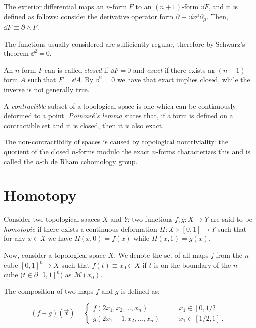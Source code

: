 \documentclass[main.tex]{subfiles}
\begin{document}
The exterior differential maps an \(n\)-form \(F\) to an \((n+1)\)-form \(\dd{F}\), and it is defined as follows:
consider the derivative operator form \(\partial \equiv \dd{x^{\mu}} \partial _\mu\).
Then, \(\dd{F} \equiv \partial \wedge F\).

The functions usually considered are sufficiently regular, therefore by Schwarz's theorem \(\dd^2 = 0\).

An \(n\)-form \(F\) can is called \emph{closed} if \(\dd{F}= 0 \) and \emph{exact} if there exists an \((n-1)\)-form \(A\) such that \(F = \dd{A}\).
By \(\dd^2=0\) we have that exact implies closed, while the inverse is not generally true.

A \emph{contractible} subset of a topological space is one which can be continuously deformed to a point.
\emph{Poincaré's lemma} states that, if a form is defined on a contractible set and it is closed, then it is also exact.

The non-contractibiliy of spaces is caused by topological nontriviality: the quotient of the closed \(n\)-forms modulo the exact \(n\)-forms characterizes this and is called the \(n\)-th de Rham cohomology group. 

\section{Homotopy} \label{sec:homotopy}

Consider two topological spaces \(X\) and \(Y\): two functions \(f, g \colon X \rightarrow Y\) are said to be \emph{homotopic} if there exists a continuous deformation \(H \colon X \times [0,1] \rightarrow Y\) such that for any \(x \in X\) we have \(H(x, 0) = f(x)\) while \(H(x, 1) = g(x)\).

Now, consider a topological space \(X\).
We denote the set of all maps \(f\) from the \(n\)-cube \([0,1]^n \rightarrow X\) such that  \(f(t) \equiv x_0 \in X\) if \(t\) is on the boundary of the \(n\)-cube (\(t\in \partial [0,1]^{n}\)) as $\mathcal M(x_0)$.

The composition of two maps \(f\) and \(g\) is defined as:

\begin{equation}
  (f+g) (\vec{x} ) = \begin{cases}
  f(2x_1, x_2, \dots, x_n) \qquad & x_1 \in [0, 1/2 ] \\
  g(2x_1-1, x_2, \dots, x_n) \qquad & x_1 \in [1/2, 1] \,.
  \end{cases}
\end{equation}
\end{document}
